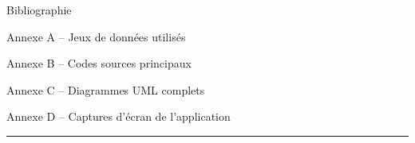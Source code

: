 \documentclass[12pt,a4paper]{report}
\begin{document}
	
	\noindent
	\colorbox{bleuPrincipal}{%
		\parbox{\linewidth}{%
			\vspace{3pt}
			\hfill{}
			\vspace{3pt}
		}%
	}
	
	
	\vspace{3pt}
	\begin{list}{}{%
			\setlength{\leftmargin}{0pt}
			\setlength{\itemsep}{4pt}
		}
		\item Bibliographie \dotfill 
		\item Annexe A \; -- \; Jeux de donn\'ees utilis\'es \dotfill 
		\item Annexe B \; -- \; Codes sources principaux \dotfill 
		\item Annexe C \; -- \; Diagrammes UML complets \dotfill 
		\item Annexe D \; -- \; Captures d'\'ecran de l'application \dotfill 
	\end{list}
	
	\vspace{0.6cm}
	\noindent\textcolor{bleuPrincipal}{\rule{\linewidth}{0.8pt}}
	
\end{document}

